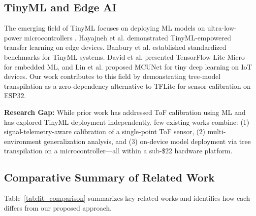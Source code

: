 \documentclass[12pt,a4paper]{article}
\begin{document}
    \subsection{TinyML and Edge AI}

    The emerging field of TinyML focuses on deploying ML models on ultra-low-power microcontrollers \cite{warden2019tinyml, wang2020tinyml}. Hayajneh et al. \cite{hayajneh2024tinyml} demonstrated TinyML-empowered transfer learning on edge devices. Banbury et al. \cite{banbury2021benchmarking} established standardized benchmarks for TinyML systems. David et al. \cite{david2021tensorflow} presented TensorFlow Lite Micro for embedded ML, and Lin et al. \cite{lin2020mcunet} proposed MCUNet for tiny deep learning on IoT devices. Our work contributes to this field by demonstrating tree-model transpilation as a zero-dependency alternative to TFLite for sensor calibration on ESP32.

    \textbf{Research Gap:} While prior work has addressed ToF calibration using ML and has explored TinyML deployment independently, few existing works combine: (1) signal-telemetry-aware calibration of a single-point ToF sensor, (2) multi-environment generalization analysis, and (3) on-device model deployment via tree transpilation on a microcontroller---all within a sub-\$22 hardware platform.

    \subsection{Comparative Summary of Related Work}

    Table~\ref{tab:lit_comparison} summarizes key related works and identifies how each differs from our proposed approach.
\end{document}
